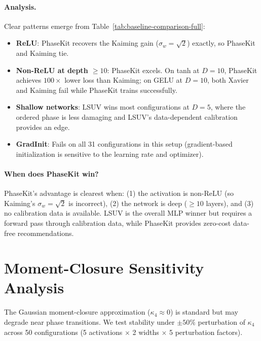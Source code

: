 \documentclass[10pt]{article}
\begin{document}
\paragraph{Analysis.}
Clear patterns emerge from Table~\ref{tab:baseline-comparison-full}:
\begin{itemize}[nosep]
    \item \textbf{ReLU}: PhaseKit recovers the Kaiming gain ($\sigma_w = \sqrt{2}$) exactly, so PhaseKit and Kaiming tie.
    \item \textbf{Non-ReLU at depth $\geq 10$}: PhaseKit excels. On tanh at $D=10$, PhaseKit achieves $100\times$ lower loss than Kaiming; on GELU at $D=10$, both Xavier and Kaiming fail while PhaseKit trains successfully.
    \item \textbf{Shallow networks}: LSUV wins most configurations at $D=5$, where the ordered phase is less damaging and LSUV's data-dependent calibration provides an edge.
    \item \textbf{GradInit}: Fails on all 31 configurations in this setup (gradient-based initialization is sensitive to the learning rate and optimizer).
\end{itemize}

\paragraph{When does PhaseKit win?}
PhaseKit's advantage is clearest when: (1) the activation is non-ReLU (so Kaiming's $\sigma_w = \sqrt{2}$ is incorrect), (2) the network is deep ($\geq 10$ layers), and (3) no calibration data is available.
LSUV is the overall MLP winner but requires a forward pass through calibration data, while PhaseKit provides zero-cost data-free recommendations.

\section{Moment-Closure Sensitivity Analysis}
\label{app:kappa4}

The Gaussian moment-closure approximation ($\kappa_4 \approx 0$) is standard but may degrade near phase transitions.
We test stability under $\pm 50\%$ perturbation of $\kappa_4$ across 50 configurations (5 activations $\times$ 2 widths $\times$ 5 perturbation factors).
\end{document}
